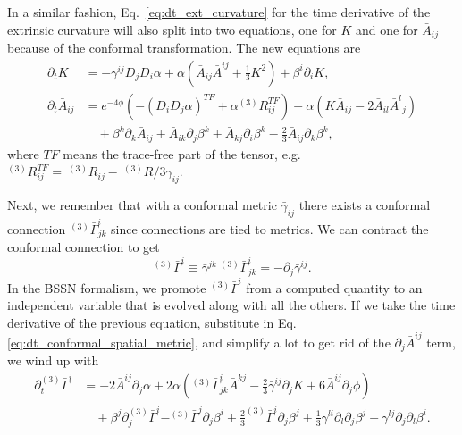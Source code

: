 \begin{bibunit}[unsrtnat]
In a similar fashion, Eq.~\ref{eq:dt_ext_curvature} for the time derivative of
the extrinsic curvature will also split into two equations, one for $K$ and one
for $\bar{A}_{ij}$ because of the conformal transformation. The new equations
are
\begin{align}
   \partial_t K &= -\gamma^{ij}D_jD_i\alpha
      + \alpha\left(\bar{A}_{ij}\bar{A}^{ij} + \frac{1}{3}K^2\right)
      + \beta^i\partial_i K, \label{eq:dt_trace_extrinsic_curvature}\\
   \partial_t\bar{A}_{ij} &= e^{-4\phi}\!\left(
      -(D_iD_j\alpha)^{TF}
      + \alpha ^{(3)}R_{ij}^{TF}\right)
      + \alpha\!\left(K\bar{A}_{ij} - 2\bar{A}_{il}{\bar{A}^l}_j\right)
      \nonumber\\
   &\quad + \beta^k\partial_k\bar{A}_{ij}
      + \bar{A}_{ik}\partial_j\beta^k
      + \bar{A}_{kj}\partial_i\beta^k
      - \frac{2}{3}\bar{A}_{ij}\partial_k\beta^k, \label{eq:dt_conformal_traceless_ext_curvature}
\end{align}
where $TF$ means the trace-free part of the tensor, e.g. $^{(3)}R_{ij}^{TF} =\ ^{(3)}\!R_{ij}
-\ ^{(3)}\!R/3\gamma_{ij}$. 

Next, we remember that with a conformal metric $\bar{\gamma}_{ij}$ there
exists a conformal connection $^{(3)}\bar{\Gamma}^i_{jk}$ since connections are
tied to metrics. We can contract the conformal connection to get
\begin{equation}
   ^{(3)}\bar{\Gamma}^i \equiv \bar{\gamma}^{jk}\ ^{(3)}\bar{\Gamma}^i_{jk} 
   = -\partial_j\bar{\gamma}^{ij}.
\end{equation}
In the BSSN formalism, we promote $^{(3)}\bar{\Gamma}^i$ from a computed quantity to
an independent variable that is evolved along with all the others. If we take
the time derivative of the previous equation, substitute in Eq.
\ref{eq:dt_conformal_spatial_metric}, and simplify a lot to get rid of the
$\partial_j\bar{A}^{ij}$ term, we wind up with
\begin{align}
   \partial_t^{(3)}\bar{\Gamma}^i &= -2\bar{A}^{ij}\partial_j\alpha
      + 2\alpha\!\left(^{(3)}\bar{\Gamma}^i_{jk}\bar{A}^{kj}
      - \frac{2}{3}\bar{\gamma}^{ij}\partial_j K
      + 6\bar{A}^{ij}\partial_j\phi\right) \nonumber\\
   &\quad
      + \beta^j\partial_j^{(3)}\bar{\Gamma}^i
      - ^{(3)}\bar{\Gamma}^j\partial_j\beta^i
      + \frac{2}{3}^{(3)}\bar{\Gamma}^i\partial_j\beta^j
      + \frac{1}{3}\bar{\gamma}^{li}\partial_l\partial_j\beta^j
      + \bar{\gamma}^{lj}\partial_j\partial_l\beta^i \label{eq:dt_conformal_connection}.
\end{align}


\end{bibunit}
